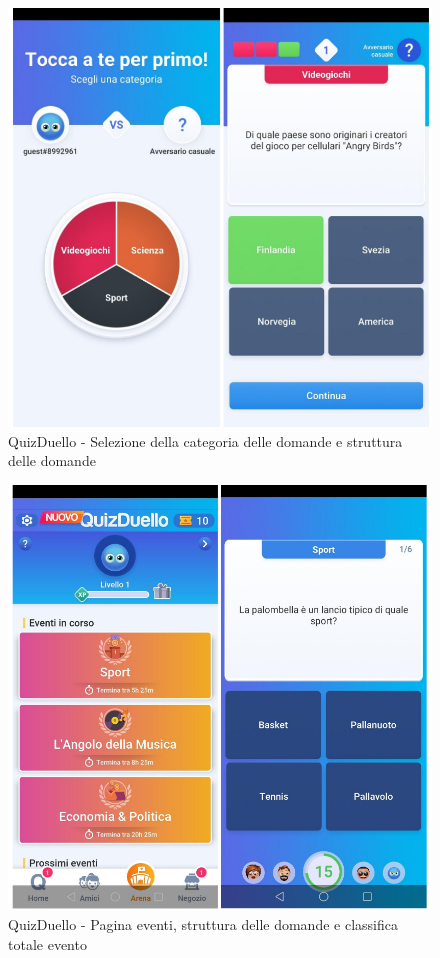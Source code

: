 \documentclass{article}
\begin{document}
\begin{figure}[htp]
\begin{center}
\includegraphics[width=1 \textwidth]{Figure23.png}
\caption{QuizDuello - Selezione della categoria delle domande e struttura delle domande}
\end{center}
\end{figure}

\begin{figure}[htp]
\begin{center}
\includegraphics[width=1 \textwidth]{Figure24.png}
\caption{QuizDuello - Pagina eventi, struttura delle domande e classifica totale evento}
\end{center}
\end{figure}
\end{document}
